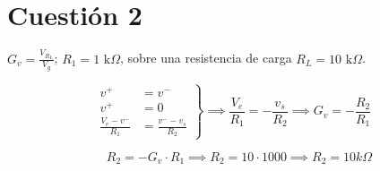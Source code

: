 \documentclass{article}
\begin{document}
	
	\section{Cuestión 2}
	\begin{center}
		$G_v = \frac{V_{R_L}}{V_g}$; $R_1 = 1\text{ k}\Omega$, sobre una resistencia de carga $R_L = 10\text{ k}\Omega$.
	\end{center}
	
	
	\[
	\left.
	\begin{aligned}
		v^+ &= v^- \\
		v^+ &= 0 \\
		\frac{V_e - v^-}{R_1} &= \frac{v^- - v_s}{R_2}
	\end{aligned}
	\right\}
	\implies \frac{V_e}{R_1} = -\frac{v_s}{R_2} \implies G_v = -\frac{R_2}{R_1}
	\]
	
	\begin{center}
	\end{center}		
	\[ 	
	 \quad R_2 = -G_v \cdot R_1\implies R_2 = 10 \cdot 1000 \implies R_2 = 10k\Omega
	\]
	
\end{document}

